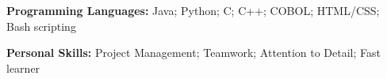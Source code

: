 \documentclass[class=article, crop=false]{standalone}
\begin{document}
\textbf{Programming Languages:} Java; Python; C; C++; COBOL; HTML/CSS; 
Bash scripting

\textbf{Personal Skills:} Project Management; Teamwork; Attention to Detail;
Fast learner
\end{document}
